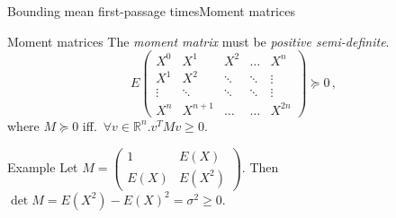 \documentclass[9pt]{beamer}
\newcommand{\expSym}{{E}}
\newcommand{\E}[1]{\ensuremath{\expSym\left(#1\right)}}
\newcommand{\bottomcite}[1]{\vspace*{\fill} {\scriptsize \parencite{#1}}}
\begin{document}
\begin{frame}{Bounding mean first-passage times}{Moment matrices}
    \begin{block}{Moment matrices}
    The \emph{moment matrix} must be \emph{positive semi-definite}.
    \[
        \E{\begin{matrix}
            X^0 & X^1 & X^2 & \dots & X^n \\
            X^1 & X^2 & \ddots & \ddots & \vdots \\
            \vdots & \ddots & \ddots & \ddots & \vdots \\
            X^n & X^{n+1} & \dots & \dots & X^{2n}
        \end{matrix}}\succeq 0 \,,
    \]
        where $M\succeq 0$ iff.\ $\forall v \in \mathbb{R}^n. v^T M v\geq 0$.
    \end{block}
          \begin{exampleblock}{Example}
              Let
              $M=\left(\begin{matrix} 1 & \E{X} \\
              \E{X} & \E{X^2} \end{matrix}\right)$. Then $\det M = \E{X^2}-\E{X}^2 = \sigma^2 \geq 0$.
          \end{exampleblock}
\bottomcite{backenkohler2019bounding}
\end{frame}
\end{document}
